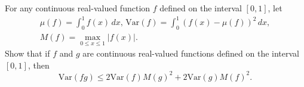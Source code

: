 For any continuous real-valued function $f$ defined on the interval $[0,1]$, let
\begin{gather*}
\mu(f) = \int_0^1 f(x)\,dx, \,
\mathrm{Var}(f) = \int_0^1 (f(x) - \mu(f))^2\,dx, \\
M(f) = \max_{0 \leq x \leq 1} \left| f(x) \right|.
\end{gather*}
Show that if $f$ and $g$ are continuous real-valued functions
defined on the interval $[0,1]$,
then
\[
\mathrm{Var}(fg) \leq 2 \mathrm{Var}(f) M(g)^2 + 2 \mathrm{Var}(g) M(f)^2.
\]
